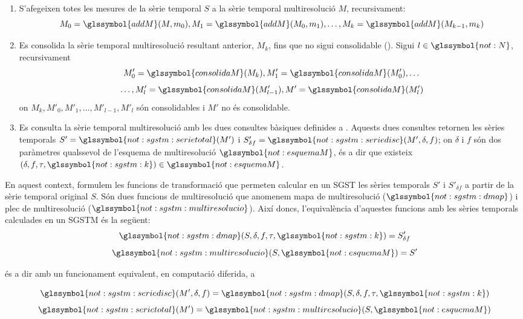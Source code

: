 \begin{enumerate}
\item S'afegeixen totes les mesures de la sèrie temporal $S$ a la sèrie temporal
multiresolució $M$, recursivament:
\[
M_0=\glssymbol{addM}(M,m_0),M_1=\glssymbol{addM}(M_0,m_1),\dotsc,M_k=\glssymbol{addM}(M_{k-1},m_k)
\]

\item Es consolida la sèrie temporal multiresolució resultant anterior, $M_k$,
  fins que no sigui consolidable
  (). Sigui
  $l\in\glssymbol{not:N}$, recursivament
\[
M'_0=\glssymbol{consolidaM}(M_k),M'_1=\glssymbol{consolidaM}(M_0'),\dotsc\]
\[\dotsc,M'_{l}=\glssymbol{consolidaM}(M'_{l-1}),M'=\glssymbol{consolidaM}(M'_{l})
\]
on $M_k,M'_{0},M'_{1},\dotsc,M'_{l-1},M'_{l}$ són consolidables i $M'$ no és
consolidable.  

\item Es consulta la sèrie temporal multiresolució amb les dues
  consultes bàsiques definides a
  . Aquests dues consultes retornen les
  sèries temporals $S'=\glssymbol{not:sgstm:serietotal}(M')$ i
  $S'_{\delta f}=\glssymbol{not:sgstm:seriedisc}(M',\delta,f)$; on
  $\delta$ i $f$ són dos paràmetres qualssevol de l'esquema de
  multiresolució $\glssymbol{not:esquemaM}$, és a dir que existeix
  $(\delta,f,\tau,\glssymbol{not:sgstm:k}) \in
  \glssymbol{not:esquemaM}$.
\end{enumerate}



En aquest context, formulem les funcions de transformació que permeten
calcular en un \gls{SGST} les sèries temporals $S'$ i $S'_{\delta f}$
a partir de la sèrie temporal original $S$. Són dues funcions de
multiresolució que anomenem mapa de multiresolució
($\glssymbol{not:sgstm:dmap}$) i plec de multiresolució
($\glssymbol{not:sgstm:multiresolucio}$). Així doncs, l'equivalència
d'aquestes funcions amb les sèries temporals calculades en un
\gls{SGSTM} és la següent:
\[
\glssymbol{not:sgstm:dmap}(S,\delta,f,\tau,\glssymbol{not:sgstm:k})=S'_{\delta f}
\]
\[
 \glssymbol{not:sgstm:multiresolucio}(S,\glssymbol{not:esquemaM})= S'
\]


és a dir amb un funcionament equivalent, en computació diferida, a

\[
\glssymbol{not:sgstm:seriedisc}(M',\delta,f) =
\glssymbol{not:sgstm:dmap}(S,\delta,f,\tau,\glssymbol{not:sgstm:k})
\]
\[
\glssymbol{not:sgstm:serietotal}(M') = \glssymbol{not:sgstm:multiresolucio}(S,\glssymbol{not:esquemaM})
\]


